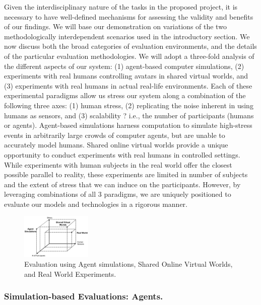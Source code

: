 Given the interdisciplinary nature of the tasks in the proposed project, it is necessary to have well-defined mechanisms for assessing the validity and benefits of our findings. We will base our demonstration on variations of the two methodologically interdependent scenarios used in the introductory section.  We now discuss both the broad categories of evaluation environments, and the details of the particular evaluation methodologies. 
We will adopt a three-fold analysis of the different aspects of our system: (1) agent-based computer simulations, (2) experiments with real humans controlling avatars in shared virtual worlds, and (3) experiments with real humans in actual real-life environments. Each of these experimental paradigms allow us stress our system along a combination of the following three axes: (1) human stress, (2) replicating the noise inherent in using humans as sensors, and (3) scalability ? i.e., the number of participants (humans or agents). Agent-based simulations harness computation to simulate high-stress events in arbitrarily large crowds of computer agents, but are unable to accurately model humans. Shared online virtual worlds provide a unique opportunity to conduct experiments with real humans in controlled settings. While experiments with human subjects in the real world offer the closest possible parallel to reality, these experiments are limited in number of subjects and the extent of stress that we can induce on the participants. However, by leveraging combinations of all 3 paradigms, we are uniquely positioned to evaluate our models and technologies in a rigorous manner. 


\begin{figure} \vspace{-3mm}
	\centerline{\includegraphics[width=0.30\textwidth]{evaluation-plan.png}}
	\vspace{-3mm} \caption{\small Evaluation using Agent simulations, Shared Online Virtual Worlds, and Real World Experiments.}
	\label{fig1}
	\vspace{-3mm}
\end{figure}

\subsubsection{Simulation-based Evaluations: Agents. }

